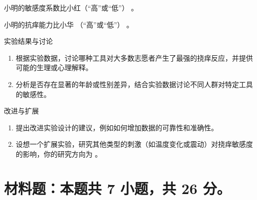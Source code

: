 \documentclass{exam-zh}
\begin{document}
\begin{question}
  小明的敏感度系数比小红\fillin[$1$]（“高”或“低”） 。
\end{question}

\begin{question}
  小明的抗痒能力比小华 \fillin[$1$]（“高”或“低”） 。
\end{question}



\begin{problem}[points = 5]实验结果与讨论
  \begin{enumerate}
    \item 根据实验数据，讨论哪种工具对大多数志愿者产生了最强的挠痒反应，并提供可能的生理或心理解释。

    \item 分析是否存在显著的年龄或性别差异，结合实验数据讨论不同人群对特定工具的敏感性。


  \end{enumerate}
 
\end{problem}


\begin{problem}[points = 5]改进与扩展
  \begin{enumerate}
    \item 提出改进实验设计的建议，例如如何增加数据的可靠性和准确性。

    \item 设想一个扩展实验，研究其他类型的刺激（如温度变化或震动）对挠痒敏感度的影响，你的研究方向为 \fillin[width = 2cm][$1$]。


  \end{enumerate}
 
\end{problem}


\section{材料题：本题共 7 小题，共 26 分。}
\end{document}
